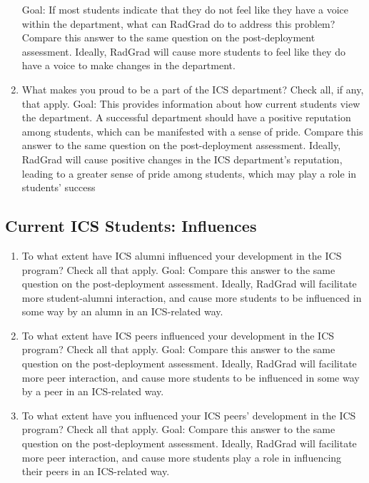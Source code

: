 \begin{enumerate}
Goal: If most students indicate that they do not feel like they have a voice within the department, what can RadGrad do to address this problem? Compare this answer to the same question on the post-deployment assessment. Ideally, RadGrad will cause more students to feel like they do have a voice to make changes in the department.
\item What makes you proud to be a part of the ICS department? Check all, if any, that apply.
Goal: This provides information about how current students view the department. A successful department should have a positive reputation among students, which can be manifested with a sense of pride. Compare this answer to the same question on the post-deployment assessment. Ideally, RadGrad will cause positive changes in the ICS department's reputation, leading to a greater sense of pride among students, which may play a role in students' success
\end{enumerate}

\subsection{Current ICS Students: Influences}
\begin{enumerate}
\item To what extent have ICS alumni influenced your development in the ICS program? Check all that apply.
Goal: Compare this answer to the same question on the post-deployment assessment. Ideally, RadGrad will facilitate more student-alumni interaction, and cause more students to be influenced in some way by an alumn in an ICS-related way.
\item To what extent have ICS peers influenced your development in the ICS program? Check all that apply.
Goal: Compare this answer to the same question on the post-deployment assessment. Ideally, RadGrad will facilitate more peer interaction, and cause more students to be influenced in some way by a peer in an ICS-related way.
\item To what extent have you influenced your ICS peers’ development in the ICS program? Check all that apply.
Goal: Compare this answer to the same question on the post-deployment assessment. Ideally, RadGrad will facilitate more peer interaction, and cause more students play a role in influencing their peers in an ICS-related way.
\end{enumerate}

